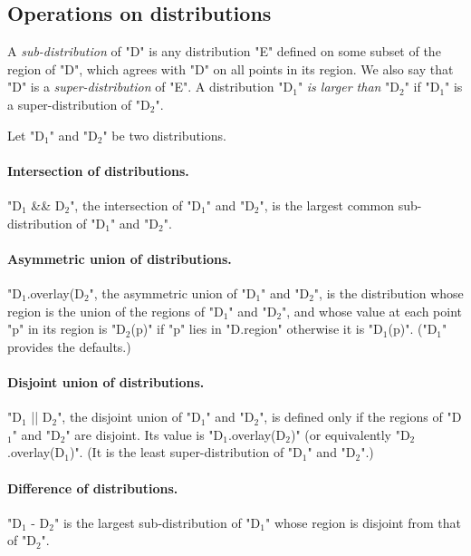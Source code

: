 \subsection{Operations on distributions}

A {\em sub-distribution} of \xcd"D" is
any distribution \xcd"E" defined on some subset of the region of
\xcd"D", which agrees with \xcd"D" on all points in its region.
We also say that \xcd"D" is a {\em super-distribution} of
\xcd"E". A distribution \xcdmath"D$_1$" {\em is larger than}
\xcdmath"D$_2$" if \xcdmath"D$_1$" is a super-distribution of
\xcdmath"D$_2$".

Let \xcdmath"D$_1$" and \xcdmath"D$_2$" be two distributions.  


\paragraph{Intersection of distributions.}
\xcdmath"D$_1$ && D$_2$", the intersection of \xcdmath"D$_1$"
and \xcdmath"D$_2$", is the largest common sub-distribution of
\xcdmath"D$_1$" and \xcdmath"D$_2$".

\paragraph{Asymmetric union of distributions.}
\xcdmath"D$_1$.overlay(D$_2$", the asymmetric union of
\xcdmath"D$_1$" and \xcdmath"D$_2$", is the distribution whose
region is the union of the regions of \xcdmath"D$_1$" and
\xcdmath"D$_2$", and whose value at each point \xcd"p" in its
region is \xcdmath"D$_2$(p)" if \xcdmath"p" lies in
\xcdmath"D.region" otherwise it is \xcdmath"D$_1$(p)".
(\xcdmath"D$_1$" provides the defaults.)

\paragraph{Disjoint union of distributions.}
\xcdmath"D$_1$ || D$_2$", the disjoint union of \xcdmath"D$_1$"
and \xcdmath"D$_2$", is defined only if the regions of
\xcdmath"D$_1$" and \xcdmath"D$_2$" are disjoint. Its value is
\xcdmath"D$_1$.overlay(D$_2$)" (or equivalently
\xcdmath"D$_2$.overlay(D$_1$)".  (It is the least
super-distribution of \xcdmath"D$_1$" and \xcdmath"D$_2$".)

\paragraph{Difference of distributions.}
\xcdmath"D$_1$ - D$_2$" is the largest sub-distribution of
\xcdmath"D$_1$" whose region is disjoint from that of
\xcdmath"D$_2$".


